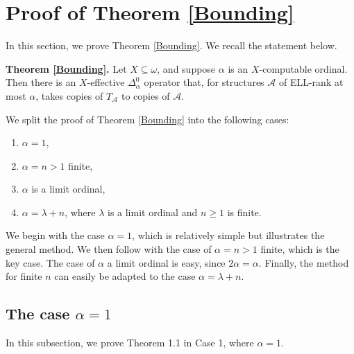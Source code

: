 \documentclass[10pt,a4paper]{article}
\newcommand{\ELL}{\textnormal{ELL}}
\theoremstyle{definition}
\begin{document}
	\section{Proof of Theorem \ref{Bounding}} \label{sec:mainproof}
	
	In this section, we prove Theorem \ref{Bounding}. We recall the statement below. 
	
	\bigskip
	\noindent
	\textbf{Theorem \ref{Bounding}.} Let $X\subseteq\omega$, and suppose $\alpha$ is an $X$-computable ordinal. Then there is an $X$-effective $\Delta^0_\alpha$ operator that, for structures $\mathcal{A}$ of \ELL-rank at most $\alpha$, takes copies of $T_\mathcal{A}$ to copies of $\mathcal{A}$. 
	
	
	\bigskip
	
	We split the proof of Theorem \ref{Bounding} into the following cases: 
	
	\begin{enumerate}
		
		\item $\alpha = 1$, 
		
		\item $\alpha = n > 1$ finite, 
		
		\item $\alpha$ is a limit ordinal, 
		
		\item $\alpha = \lambda + n$, where $\lambda$ is a limit ordinal and $n\geq 1$ is finite. 
		
	\end{enumerate}
	
	We begin with the case $\alpha = 1$, which is relatively simple but illustrates the general method. We then follow with the case of $\alpha = n > 1$ finite, which is the key case. The case of $\alpha$ a limit ordinal is easy, since $2\alpha = \alpha$. Finally, the method for finite $n$ can easily be adapted to the case $\alpha = \lambda + n$.
	
	\subsection{The case $\alpha = 1$}
	
	In this subsection, we prove Theorem 1.1 in Case 1, where $\alpha = 1$.
	
\end{document}
